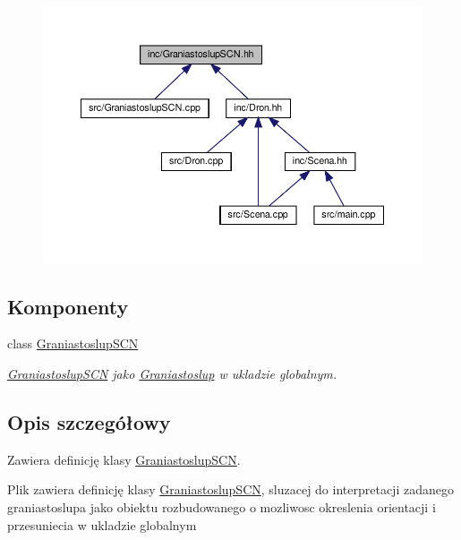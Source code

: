 \begin{figure}[H]
\begin{center}
\leavevmode
\includegraphics[width=350pt]{GraniastoslupSCN_8hh__dep__incl}
\end{center}
\end{figure}
\subsection*{Komponenty}
\begin{DoxyCompactItemize}
\item 
class \hyperlink{classGraniastoslupSCN}{Graniastoslup\+S\+CN}
\begin{DoxyCompactList}\small\item\em \hyperlink{classGraniastoslupSCN}{Graniastoslup\+S\+CN} jako \hyperlink{classGraniastoslup}{Graniastoslup} w ukladzie globalnym. \end{DoxyCompactList}\end{DoxyCompactItemize}


\subsection{Opis szczegółowy}
Zawiera definicję klasy \hyperlink{classGraniastoslupSCN}{Graniastoslup\+S\+CN}. 

Plik zawiera definicję klasy \hyperlink{classGraniastoslupSCN}{Graniastoslup\+S\+CN}, sluzacej do interpretacji zadanego graniastoslupa jako obiektu rozbudowanego o mozliwosc okreslenia orientacji i przesuniecia w ukladzie globalnym 